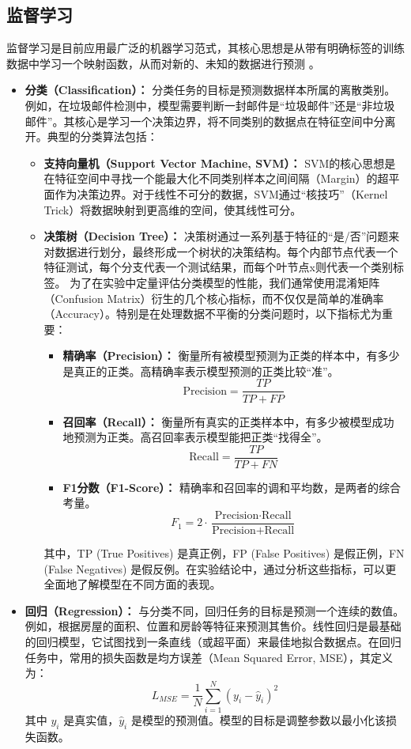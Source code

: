 \subsection{监督学习}
\label{ssec:supervised_learning}
监督学习是目前应用最广泛的机器学习范式，其核心思想是从带有明确标签的训练数据中学习一个映射函数，从而对新的、未知的数据进行预测 \cite{lecun2015deep}。
\begin{itemize}
    \item \textbf{分类（Classification）：} 分类任务的目标是预测数据样本所属的离散类别。例如，在垃圾邮件检测中，模型需要判断一封邮件是“垃圾邮件”还是“非垃圾邮件”。其核心是学习一个决策边界，将不同类别的数据点在特征空间中分离开。典型的分类算法包括：
        \begin{itemize}
            \item \textbf{支持向量机（Support Vector Machine, SVM）：} SVM的核心思想是在特征空间中寻找一个能最大化不同类别样本之间间隔（Margin）的超平面作为决策边界。对于线性不可分的数据，SVM通过“核技巧”（Kernel Trick）将数据映射到更高维的空间，使其线性可分。
            \item \textbf{决策树（Decision Tree）：} 决策树通过一系列基于特征的“是/否”问题来对数据进行划分，最终形成一个树状的决策结构。每个内部节点代表一个特征测试，每个分支代表一个测试结果，而每个叶节点x则代表一个类别标签。
            为了在实验中定量评估分类模型的性能，我们通常使用混淆矩阵（Confusion Matrix）衍生的几个核心指标，而不仅仅是简单的准确率（Accuracy）。特别是在处理数据不平衡的分类问题时，以下指标尤为重要：
			\begin{itemize}
				\item \textbf{精确率（Precision）：} 衡量所有被模型预测为正类的样本中，有多少是真正的正类。高精确率表示模型预测的正类比较“准”。
				\[
					\text{Precision} = \frac{TP}{TP + FP}
				\]
				\item \textbf{召回率（Recall）：} 衡量所有真实的正类样本中，有多少被模型成功地预测为正类。高召回率表示模型能把正类“找得全”。
				\[
					\text{Recall} = \frac{TP}{TP + FN}
				\]
				\item \textbf{F1分数（F1-Score）：} 精确率和召回率的调和平均数，是两者的综合考量。
				\[
					F_1 = 2 \cdot \frac{\text{Precision} \cdot \text{Recall}}{\text{Precision} + \text{Recall}}
				\]
			\end{itemize}
				其中，TP (True Positives) 是真正例，FP (False Positives) 是假正例，FN (False Negatives) 是假反例。在实验结论中，通过分析这些指标，可以更全面地了解模型在不同方面的表现。
        \end{itemize}
    \item \textbf{回归（Regression）：} 与分类不同，回归任务的目标是预测一个连续的数值。例如，根据房屋的面积、位置和房龄等特征来预测其售价。线性回归是最基础的回归模型，它试图找到一条直线（或超平面）来最佳地拟合数据点。在回归任务中，常用的损失函数是均方误差（Mean Squared Error, MSE），其定义为：
    $$ L_{MSE} = \frac{1}{N} \sum_{i=1}^{N} (y_i - \hat{y}_i)^2 $$
    其中 $y_i$ 是真实值，$\hat{y}_i$ 是模型的预测值。模型的目标是调整参数以最小化该损失函数。
\end{itemize}

